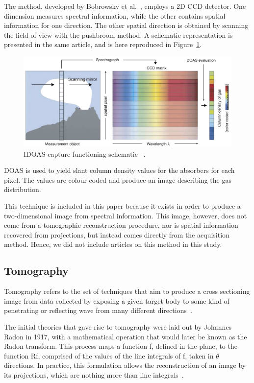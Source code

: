 The method, developed by Bobrowsky et al.~\cite{Bobrowski2006}, employs a 2D
CCD detector. One dimension measures spectral information, while the
other contains spatial information for one direction. The other spatial
direction is obtained by scanning the field of view with the pushbroom
method. A schematic representation is presented in the same article, and
is here reproduced in Figure~\ref{fig:idoas_schematic}.

\begin{figure}[htpb]
    \centering
    \includegraphics[width=0.8\linewidth]{img/idoas_schematic.png}
    \caption{IDOAS capture functioning schematic ~\cite{Bobrowski2006}.}
    \label{fig:idoas_schematic}
\end{figure}

DOAS is used to yield slant column density values for the absorbers for
each pixel. The values are colour coded and produce an image describing
the gas distribution.

This technique is included in this paper because it exists in order to
produce a two-dimensional image from spectral information. This image,
however, does not come from a tomographic reconstruction procedure, nor
is spatial information recovered from projections, but instead comes
directly from the acquisition method. Hence, we did not include articles
on this method in this study.

\subsection{Tomography}
\label{sub:tomography}
Tomography refers to the set of techniques that aim to produce a cross
sectioning image from data collected by exposing a given target body to
some kind of penetrating or reflecting wave from many different
directions~\cite{Herman2009, Kak2001a}.

The initial theories that gave rise to tomography were laid out by
Johannes Radon in 1917, with a mathematical operation that  would later
be known as the Radon transform. This process maps a function f, defined
in the plane, to the function Rf, comprised of the values of the line
integrals of f, taken in $\theta$ directions. In practice, this
formulation allows the reconstruction of an image by its projections,
which are nothing more than line integrals~\cite{Feeman2010}.

